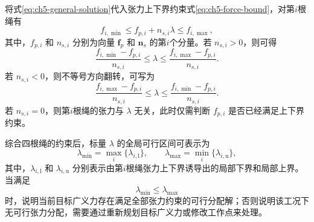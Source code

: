 将式\eqref{eq:ch5-general-solution}代入张力上下界约束式\eqref{eq:ch5-force-bound}，对第$i$根绳有
\begin{equation}
  f_{i,\min}\le f_{p,i}+n_{s,i}\lambda\le f_{i,\max}, \label{eq:ch5-lambda-ineq}
\end{equation}
其中，$f_{p,i}$ 和 $n_{s,i}$ 分别为向量 $\bm f_p$ 和 $\bm n_s$ 的第$i$个分量。若 $n_{s,i}>0$，则可得
\begin{equation}
  \frac{f_{i,\min}-f_{p,i}}{n_{s,i}}\le \lambda\le \frac{f_{i,\max}-f_{p,i}}{n_{s,i}}. \label{eq:ch5-lambda-positive}
\end{equation}
若 $n_{s,i}<0$，则不等号方向翻转，可写为
\begin{equation}
  \frac{f_{i,\max}-f_{p,i}}{n_{s,i}}\le \lambda\le \frac{f_{i,\min}-f_{p,i}}{n_{s,i}}. \label{eq:ch5-lambda-negative}
\end{equation}
若 $n_{s,i}=0$，则第$i$根绳的张力与 $\lambda$ 无关，此时仅需判断 $f_{p,i}$ 是否已经满足上下界约束。

综合四根绳的约束后，标量 $\lambda$ 的全局可行区间可表示为
\begin{equation}
  \lambda_{\min}=\max_i\{\lambda_{i,\mathrm l}\},\qquad \lambda_{\max}=\min_i\{\lambda_{i,\mathrm u}\}, \label{eq:ch5-lambda-bounds}
\end{equation}
其中，$\lambda_{i,\mathrm l}$ 和 $\lambda_{i,\mathrm u}$ 分别表示由第$i$根绳张力上下界诱导出的局部下界和局部上界。当满足
\begin{equation}
  \lambda_{\min}\le \lambda_{\max} \label{eq:ch5-feasible-interval}
\end{equation}
时，说明当前目标广义力存在满足全部张力约束的可行分配解；否则说明该工况下无可行张力分配，需要通过重新规划目标广义力或修改工作点来处理\cite{gouttefarde2007wrench,phan2021wrenchclosure}。

